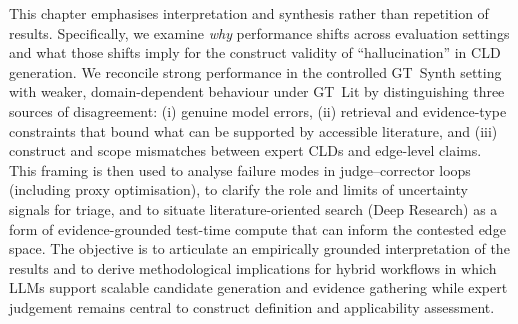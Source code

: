 %
%

\noindent
This chapter emphasises interpretation and synthesis rather than repetition of results. Specifically, we examine \emph{why} performance shifts across evaluation settings and what those shifts imply for the construct validity of ``hallucination'' in CLD generation. We reconcile strong performance in the controlled GT~Synth setting with weaker, domain-dependent behaviour under GT~Lit by distinguishing three sources of disagreement: (i) genuine model errors, (ii) retrieval and evidence-type constraints that bound what can be supported by accessible literature, and (iii) construct and scope mismatches between expert CLDs and edge-level claims. This framing is then used to analyse failure modes in judge--corrector loops (including proxy optimisation), to clarify the role and limits of uncertainty signals for triage, and to situate literature-oriented search (Deep Research) as a form of evidence-grounded test-time compute that can inform the contested edge space. The objective is to articulate an empirically grounded interpretation of the results and to derive methodological implications for hybrid workflows in which LLMs support scalable candidate generation and evidence gathering while expert judgement remains central to construct definition and applicability assessment.


